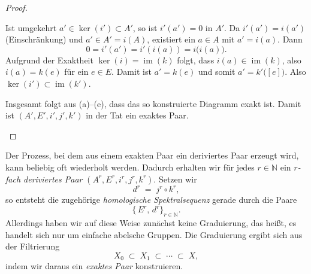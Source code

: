 \documentclass[12pt, hidelinks]{article}
\numberwithin{conj}{section}
\newcommand{\ima}{\operatorname{im}}
\begin{document}
\begin{proof}
\begin{enumerate}[nolistsep]
              Ist umgekehrt $a' \in \ker(i') \subset A'$, so ist $i'(a') = 0$ in $A'$. Da $i'(a') = i(a')$ (Einschränkung) und $a' \in A' = i(A)$, existiert ein $a \in A$ mit $a' = i(a)$. Dann
              \[
                0 = i'(a') = i'(i(a)) = i\bigl(i(a)\bigr).
              \]
              Aufgrund der Exaktheit $\ker(i) = \ima(k)$ folgt, dass $i(a) \in \ima(k)$, also $i(a) = k(e)$ für ein $e \in E$. Damit ist $a' = k(e)$ und somit $a' = k'\bigl([e]\bigr)$. Also $\ker(i') \subset \ima(k')$. 
              
              Insgesamt folgt aus (a)--(e), dass das so konstruierte Diagramm exakt ist. Damit ist $(A', E', i', j', k')$ in der Tat ein exaktes Paar.
    \end{enumerate}
\end{proof}

Der Prozess, bei dem aus einem exakten Paar ein deriviertes Paar erzeugt wird, kann beliebig oft wiederholt werden. Dadurch erhalten wir für jedes $r \in \mathbb{N}$ ein \emph{$r$-fach deriviertes Paar} $(A^r, E^r, i^r, j^r, k^r)$. Setzen wir
\[
    d^r \;=\; j^r \circ k^r,
\]
so entsteht die zugehörige \emph{homologische Spektralsequenz} gerade durch die Paare
\[
    \{\,E^r,\, d^r\}_{r \in \mathbb{N}}.
\]
Allerdings haben wir auf diese Weise zunächst keine Graduierung, das heißt, es handelt sich nur um einfache abelsche Gruppen. Die Graduierung ergibt sich aus der Filtrierung
\[
    X_0 \;\subset\; X_1 \;\subset\; \cdots \;\subset\; X,
\]
indem wir daraus ein \emph{exaktes Paar} konstruieren.
\end{document}
